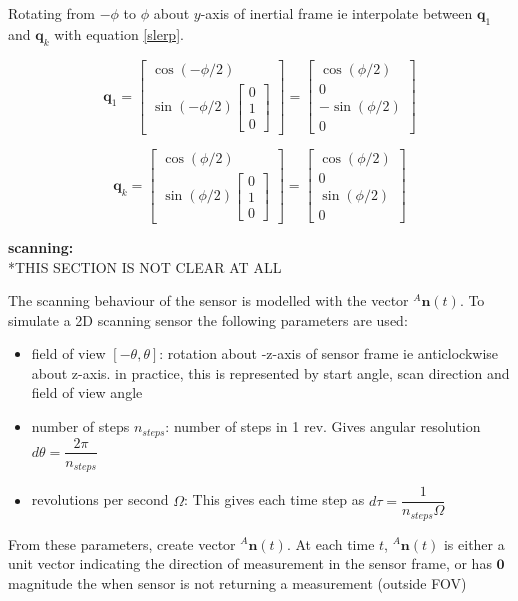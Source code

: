 													
Rotating from $-\phi$ to $\phi$ about $y$-axis of inertial frame ie interpolate between $\mathbf{q}_1$ and $\mathbf{q}_k$ with equation \ref{slerp}.
	
\begin{equation}
	\mathbf{q}_1 = \begin{bmatrix}
				 	\cos(-\phi/2) \\
				 	\sin(-\phi/2){\begin{bmatrix}
								 	0 \\ 1 \\ 0
							   	 \end{bmatrix}}
				 \end{bmatrix}
				 = \begin{bmatrix}
		 		   		\cos(\phi/2) \\ 0 \\ -\sin(\phi/2) \\ 0
				   \end{bmatrix}
\end{equation}

\begin{equation}
	\mathbf{q}_k = \begin{bmatrix}
				 	\cos(\phi/2) \\
				 	\sin(\phi/2){\begin{bmatrix}
								 	0 \\ 1 \\ 0
							   	 \end{bmatrix}}
				 \end{bmatrix}
				 = \begin{bmatrix}
		 		   		\cos(\phi/2) \\ 0 \\ \sin(\phi/2) \\ 0
				   \end{bmatrix}
\end{equation}

\textbf{scanning:}\\
*THIS SECTION IS NOT CLEAR AT ALL

The scanning behaviour of the sensor is modelled with the vector ${^{A}\mathbf{n}(t)}$.
To simulate a 2D scanning sensor the following parameters are used:
\begin{itemize}
\item field of view $[-\theta,\theta]$: rotation about -z-axis of sensor frame ie anticlockwise about z-axis. in practice, this is represented by start angle, scan direction and field of view angle
\item number of steps $n_{steps}$: number of steps in 1 rev. Gives angular resolution $d\theta = \dfrac{2\pi}{n_{steps}}$
\item revolutions per second $\Omega$: This gives each time step as $d\tau = \dfrac{1}{n_{steps}\Omega}$
\end{itemize}
From these parameters, create vector ${^{A}\mathbf{n}(t)}$. At each time $t$, ${^{A}\mathbf{n}(t)}$ is either a unit vector indicating the direction of measurement in the sensor frame, or has $\mathbf{0}$ magnitude the when sensor is not returning a measurement (outside FOV)


